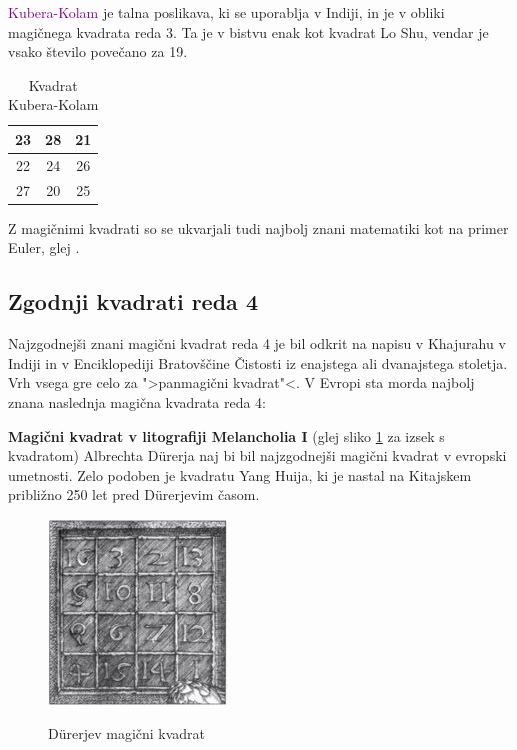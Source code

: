 \documentclass[a4paper,12pt]{article}
\begin{document}
\textcolor{purple}{Kubera-Kolam} je talna poslikava, ki se uporablja v Indiji, in je v
obliki magičnega kvadrata reda 3. Ta je v bistvu enak kot kvadrat
Lo Shu, vendar je vsako število povečano za 19.

\begin{table}[h!]
   \centering
   \caption{Kvadrat Kubera-Kolam}
   \label{tabel:kuber} 
   \begin{tabular}{|c|c|c|}
       \hline
       23 & 28 & 21 \\\hline
       22 & 24 & 26 \\\hline
       27 & 20 & 25 \\\hline
   \end{tabular}
\end{table}


Z magičnimi kvadrati so se ukvarjali tudi najbolj znani matematiki kot na
primer Euler, glej \cite{euler1849}. 


\subsection{Zgodnji kvadrati reda 4}

Najzgodnejši znani magični kvadrat reda 4 je bil odkrit na napisu
v Khajurahu v Indiji in v Enciklopediji Bratovščine Čistosti iz enajstega
ali dvanajstega stoletja. Vrh vsega gre celo za ">panmagični kvadrat"<.
V Evropi sta morda najbolj znana naslednja magična kvadrata reda 4:

\textbf{Magični kvadrat v litografiji Melancholia I} (glej sliko \ref{fig:durer}
za izsek s kvadratom) Albrechta Dürerja naj bi bil najzgodnejši magični kvadrat
v evropski umetnosti. Zelo podoben je kvadratu Yang Huija, ki je nastal na Kitajskem
približno 250 let pred Dürerjevim časom. 

\begin{figure}[h!]
   \centering
   \caption{Dürerjev magični kvadrat}
   \includegraphics[scale=1.5]{durer.png}
   \label{fig:durer}
\end{figure}
\end{document}

